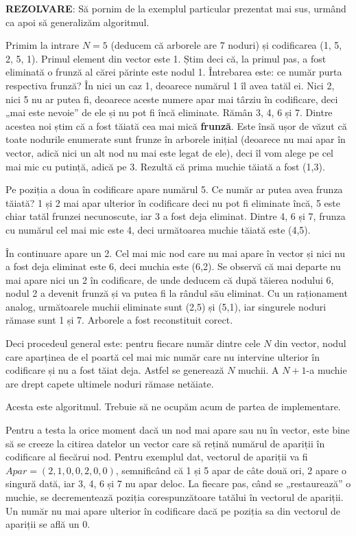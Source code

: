 {\bf REZOLVARE}: Să pornim de la exemplul particular prezentat mai sus, urmând
ca apoi să generalizăm algoritmul.

Primim la intrare $N=5$ (deducem că arborele are 7 noduri) și codificarea (1,
5, 2, 5, 1). Primul element din vector este 1. Știm deci că, la primul pas, a
fost eliminată o frunză al cărei părinte este nodul 1. Întrebarea este: ce
număr purta respectiva frunză? În nici un caz 1, deoarece numărul 1 îl avea
tatăl ei. Nici 2, nici 5 nu ar putea fi, deoarece aceste numere apar mai
târziu în codificare, deci „mai este nevoie” de ele și nu pot fi încă
eliminate. Rămân 3, 4, 6 și 7. Dintre acestea noi știm că a fost tăiată cea
mai mică {\bf frunză}. Este însă ușor de văzut că toate nodurile enumerate
sunt frunze în arborele inițial (deoarece nu mai apar în vector, adică nici un
alt nod nu mai este legat de ele), deci îl vom alege pe cel mai mic cu
putință, adică pe 3. Rezultă că prima muchie tăiată a fost (1,3).

Pe poziția a doua în codificare apare numărul 5. Ce număr ar putea avea frunza
tăiată? 1 și 2 mai apar ulterior în codificare deci nu pot fi eliminate încă,
5 este chiar tatăl frunzei necunoscute, iar 3 a fost deja eliminat. Dintre 4,
6 și 7, frunza cu numărul cel mai mic este 4, deci următoarea muchie tăiată
este (4,5).

În continuare apare un 2. Cel mai mic nod care nu mai apare în vector și nici
nu a fost deja eliminat este 6, deci muchia este (6,2). Se observă că mai
departe nu mai apare nici un 2 în codificare, de unde deducem că după tăierea
nodului 6, nodul 2 a devenit frunză și va putea fi la rândul său eliminat. Cu
un raționament analog, următoarele muchii eliminate sunt (2,5) și (5,1), iar
singurele noduri rămase sunt 1 și 7. Arborele a fost reconstituit corect.

Deci procedeul general este: pentru fiecare număr dintre cele $N$ din vector,
nodul care aparținea de el poartă cel mai mic număr care nu intervine ulterior
în codificare și nu a fost tăiat deja. Astfel se generează $N$ muchii. A
$N+1$-a muchie are drept capete ultimele noduri rămase netăiate.

Acesta este algoritmul. Trebuie să ne ocupăm acum de partea de implementare.

Pentru a testa la orice moment dacă un nod mai apare sau nu în vector, este
bine să se creeze la citirea datelor un vector care să rețină numărul de
apariții în codificare al fiecărui nod. Pentru exemplul dat, vectorul de
apariții va fi $Apar=(2,1,0,0,2,0,0)$, semnificând că 1 și 5 apar de câte două
ori, 2 apare o singură dată, iar 3, 4, 6 și 7 nu apar deloc. La fiecare pas,
când se „restaurează” o muchie, se decrementează poziția corespunzătoare
tatălui în vectorul de apariții. Un număr nu mai apare ulterior în codificare
dacă pe poziția sa din vectorul de apariții se află un 0.

